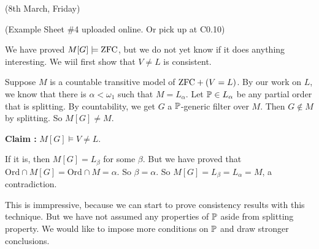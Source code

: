 \documentclass[12pt,a4paper]{article}
\newenvironment{proof}
{\begin{changemargin}{0.5cm}{0.5cm} 
	}%
	{\end{changemargin}
}
\newenvironment{p}
{\begin{proof} 
	}%
	{\end{proof}
}
\begin{document}
(8th March, Friday)
\s

(Example Sheet \#4 uploaded online. Or pick up at C0.10)
\s

We have proved $M[G] \models \text{ZFC}$, but we do not yet know if it does anything interesting. We wiil first show that $V\neq L$ is consistent.
\s

Suppose $M$ is a countable transitive model of $\text{ZFC} +(V=L)$. By our work on $L$, we know that there is $\alpha < \omega_1$ such that $M= L_{\alpha}$. Let $\mathbb{P} \in L_{\alpha}$ be any partial order that is splitting. By countability, we get $G$ a $\mathbb{P}$-generic filter over $M$. Then $G\not\in M$ by splitting. So $M[G] \neq M$. 
\s

\textbf{Claim :} $M[G] \models V\neq L$.
\begin{p}
\pf If it is, then $M[G] = L_{\beta}$ for some $\beta$. But we have proved that $\text{Ord} \cap M[G] = \text{Ord} \cap M =\alpha$. So $\beta = \alpha$. So $M[G] = L_{\beta} = L_{\alpha} =M$, a contradiction.

\eop
\end{p}
\s

This is immpressive, because we can start to prove consistency results with this technique. But we have not assumed any properties of $\mathbb{P}$ aside from splitting property. We would like to impose more conditions on $\mathbb{P}$ and draw stronger conclusions.
\end{document}
